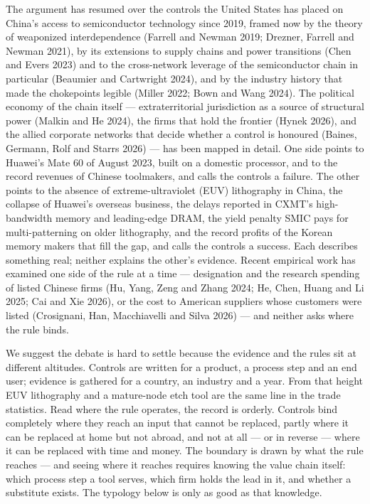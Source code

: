 \documentclass[12pt]{article}
\begin{document}
The argument has resumed over the controls the United States has placed on China's access to semiconductor technology since 2019, framed now by the theory of weaponized interdependence (Farrell and Newman 2019; Drezner, Farrell and Newman 2021), by its extensions to supply chains and power transitions (Chen and Evers 2023) and to the cross-network leverage of the semiconductor chain in particular (Beaumier and Cartwright 2024), and by the industry history that made the chokepoints legible (Miller 2022; Bown and Wang 2024). The political economy of the chain itself --- extraterritorial jurisdiction as a source of structural power (Malkin and He 2024), the firms that hold the frontier (Hynek 2026), and the allied corporate networks that decide whether a control is honoured (Baines, Germann, Rolf and Starrs 2026) --- has been mapped in detail. One side points to Huawei's Mate 60 of August 2023, built on a domestic processor, and to the record revenues of Chinese toolmakers, and calls the controls a failure. The other points to the absence of extreme-ultraviolet (EUV) lithography in China, the collapse of Huawei's overseas business, the delays reported in CXMT's high-bandwidth memory and leading-edge DRAM, the yield penalty SMIC pays for multi-patterning on older lithography, and the record profits of the Korean memory makers that fill the gap, and calls the controls a success. Each describes something real; neither explains the other's evidence. Recent empirical work has examined one side of the rule at a time --- designation and the research spending of listed Chinese firms (Hu, Yang, Zeng and Zhang 2024; He, Chen, Huang and Li 2025; Cai and Xie 2026), or the cost to American suppliers whose customers were listed (Crosignani, Han, Macchiavelli and Silva 2026) --- and neither asks where the rule binds.

We suggest the debate is hard to settle because the evidence and the rules sit at different altitudes. Controls are written for a product, a process step and an end user; evidence is gathered for a country, an industry and a year. From that height EUV lithography and a mature-node etch tool are the same line in the trade statistics. Read where the rule operates, the record is orderly. Controls bind completely where they reach an input that cannot be replaced, partly where it can be replaced at home but not abroad, and not at all --- or in reverse --- where it can be replaced with time and money. The boundary is drawn by what the rule reaches --- and seeing where it reaches requires knowing the value chain itself: which process step a tool serves, which firm holds the lead in it, and whether a substitute exists. The typology below is only as good as that knowledge.
\end{document}
